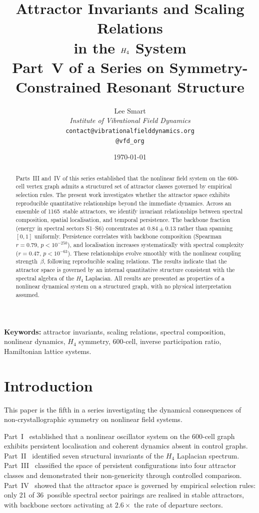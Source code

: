 \documentclass[12pt,a4paper]{article}
\title{%
  \textbf{Attractor Invariants and Scaling Relations\\
  in the $\Hfour$ System}\\[6pt]
  \large Part~V of a Series on Symmetry-Constrained Resonant Structure%
}
\author{%
  Lee Smart\\[4pt]
  \textit{Institute of Vibrational Field Dynamics}\\[2pt]
  \texttt{contact@vibrationalfielddynamics.org}\\[2pt]
  \texttt{@vfd\_org}%
}
\date{\today}
\newcommand{\Hfour}{H_4}
\begin{document}
\maketitle
\thispagestyle{empty}

\begin{abstract}
Parts~III and~IV of this series established that the nonlinear field
system on the 600-cell vertex graph admits a structured set of
attractor classes governed by empirical selection rules.  The present
work investigates whether the attractor space exhibits reproducible
quantitative relationships beyond the immediate dynamics.  Across an
ensemble of 1165~stable attractors, we identify invariant
relationships between spectral composition, spatial localisation, and
temporal persistence.  The backbone fraction (energy in spectral
sectors S1--S6) concentrates at $0.84 \pm 0.13$ rather than spanning
$[0,1]$ uniformly.  Persistence correlates with backbone composition
(Spearman $r = 0.79$, $p < 10^{-250}$), and localisation increases
systematically with spectral complexity ($r = 0.47$,
$p < 10^{-63}$).  These relationships evolve smoothly with the
nonlinear coupling strength~$\beta$, following reproducible scaling
relations.  The results indicate that the attractor space is governed
by an internal quantitative structure consistent with the spectral
algebra of the $\Hfour$ Laplacian.  All results are presented as
properties of a nonlinear dynamical system on a structured graph,
with no physical interpretation assumed.
\end{abstract}

\vspace{1em}
\noindent\textbf{Keywords:}
attractor invariants, scaling relations, spectral composition,
nonlinear dynamics, $\Hfour$ symmetry, 600-cell, inverse participation
ratio, Hamiltonian lattice systems.

\newpage
\tableofcontents
\newpage


\section{Introduction}\label{sec:intro}

This paper is the fifth in a series investigating the dynamical
consequences of non-crystallographic symmetry on nonlinear field
systems.

Part~I~\cite{paper1} established that a nonlinear oscillator system
on the 600-cell graph exhibits persistent localisation and coherent
dynamics absent in control graphs.  Part~II~\cite{paper2} identified
seven structural invariants of the $\Hfour$ Laplacian spectrum.
Part~III~\cite{paper3} classified the space of persistent
configurations into four attractor classes and demonstrated their
non-genericity through controlled comparison.
Part~IV~\cite{paper4} showed that the attractor space is governed by
empirical selection rules: only 21 of 36~possible spectral sector
pairings are realised in stable attractors, with backbone sectors
activating at $2.6\times$ the rate of departure sectors.
\end{document}
